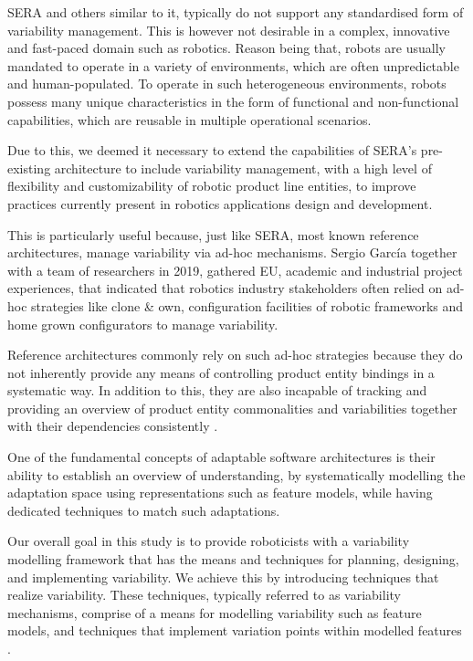 \documentclass[conference]{IEEEtran}
\begin{document}
SERA and others similar to it, typically do not support any standardised form of variability management. This is however not desirable in a complex, innovative and fast-paced domain such as robotics. Reason being that, robots are usually mandated to operate in a variety of environments, which are often unpredictable and human-populated. To operate in such heterogeneous environments, robots possess many unique characteristics in the form of functional and non-functional capabilities, which are reusable in multiple operational scenarios.

Due to this, we deemed it necessary to extend the capabilities of SERA's pre-existing architecture to include variability management, with a high level of flexibility and customizability of robotic product line entities, to improve practices currently present in robotics applications design and development.

This is particularly useful because, just like SERA, most known reference architectures, manage variability via ad-hoc mechanisms. Sergio Garc\'{i}a \cite{var-mod-chall} together with a team of researchers in 2019, gathered EU, academic and industrial project experiences, that indicated that robotics industry stakeholders often relied on ad-hoc strategies like clone \& own, configuration facilities of robotic frameworks and home grown configurators to manage variability.

Reference architectures commonly rely on such ad-hoc strategies because they do not inherently provide any means of controlling product entity bindings in a systematic way. In addition to this, they are also incapable of tracking and providing an overview of product entity commonalities and variabilities together with their dependencies consistently \cite{var-mod-ind}.

One of the fundamental concepts of adaptable software architectures is their ability to establish an overview of understanding, by systematically modelling the adaptation space using representations such as feature models, while having dedicated techniques to match such adaptations.

Our overall goal in this study is to provide roboticists with a variability modelling framework that has the means and techniques for planning, designing, and implementing variability. We achieve this by introducing techniques that realize variability. These techniques, typically referred to as variability mechanisms, comprise of a means for modelling variability such as feature models, and techniques that implement variation points within modelled features \cite{var-mod-ind}.
\end{document}
